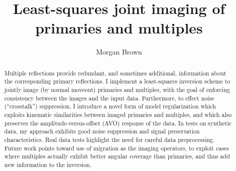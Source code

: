 
\title{Least-squares joint imaging of primaries and multiples}
\author{Morgan Brown}

\begin{abstract}
Multiple reflections provide redundant, and sometimes additional, information
	about the corresponding primary reflections.  I implement a least-squares inversion 
	scheme to jointly image (by normal moveout) primaries and multiples, with the goal of 
	enforcing consistency between the images and the input data.  Furthermore, to effect 
	noise (``crosstalk'') suppression, I introduce a novel form of
	model regularization which exploits kinematic similarities between imaged primaries
	and multiples, and which also preserves the amplitude-versus-offset (AVO) response of
	the data.  In tests on synthetic data, my approach exhibits good noise
	suppression and signal preservation characteristics.  Real data tests highlight
	the need for careful data preprocessing.  Future work points toward use
	of migration as the imaging operators, to exploit cases where multiples actually
	exhibit better angular coverage than primaries, and thus add new information to the
	inversion.
\end{abstract}

